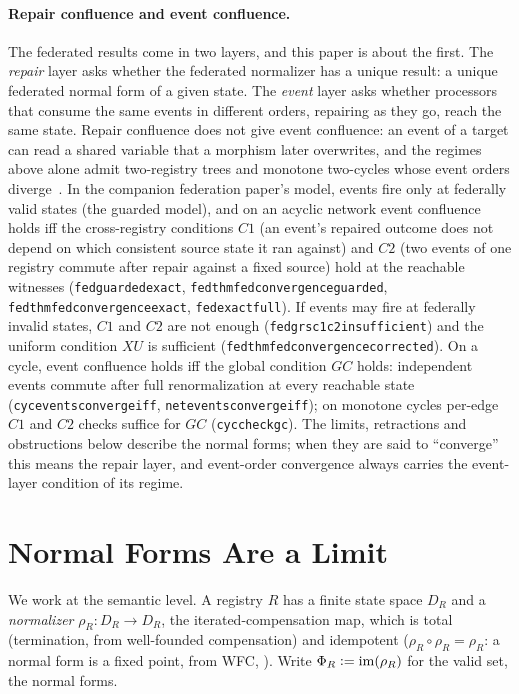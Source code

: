 \documentclass[11pt,a4paper]{article}
\theoremstyle{plain}
\theoremstyle{definition}
\theoremstyle{remark}
\newcommand{\defeq}{\vcentcolon=}
\renewcommand{\_}{\origunderscore\allowbreak}
\begin{document}
\paragraph{Repair confluence and event confluence.} The federated results come in two layers, and
this paper is about the first. The \emph{repair} layer asks whether the federated normalizer has a
unique result: a unique federated normal form of a given state. The \emph{event} layer asks whether
processors that consume the same events in different orders, repairing as they go, reach the same
state. Repair confluence does not give event confluence: an event of a target can read a shared
variable that a morphism later overwrites, and the regimes above alone admit two-registry trees and
monotone two-cycles whose event orders diverge~\cite{blackwell2026federated}. In the companion
federation paper's model, events fire only at federally valid states (the guarded model), and on an
acyclic network event confluence holds iff the cross-registry conditions $C1$ (an event's repaired
outcome does not depend on which consistent source state it ran against) and $C2$ (two events of one
registry commute after repair against a fixed source) hold at the reachable witnesses
(\texttt{fed\_guarded\_exact}, \texttt{fed\_thm\_fed\_convergence\_guarded},
\texttt{fed\_thm\_fed\_convergence\_exact}, \texttt{fed\_exact\_full}). If events may fire at
federally invalid states, $C1$ and $C2$ are not enough (\texttt{fed\_grs\_c1\_c2\_insufficient}) and
the uniform condition $XU$ is sufficient (\texttt{fed\_thm\_fed\_convergence\_corrected}). On a cycle,
event confluence holds iff the global condition $GC$ holds: independent events commute after full
renormalization at every reachable state (\texttt{cyc\_events\_converge\_iff},
\texttt{net\_events\_converge\_iff}); on monotone cycles per-edge $C1$ and $C2$ checks suffice for
$GC$ (\texttt{cyc\_check\_gc}). The limits, retractions and obstructions below describe the normal
forms; when they are said to ``converge'' this means the repair layer, and event-order convergence
always carries the event-layer condition of its regime.

\section{Normal Forms Are a Limit}
\label{sec:limit}

We work at the semantic level. A registry $R$ has a finite state space $D_R$ and a \emph{normalizer}
$\rho_R : D_R \to D_R$, the iterated-compensation map, which is total (termination, from well-founded
compensation) and idempotent ($\rho_R \circ \rho_R = \rho_R$: a normal form is a fixed point, from
WFC, ). Write $\Phi_R \defeq \mathrm{im}(\rho_R)$ for the valid set, the normal
forms.
\end{document}
